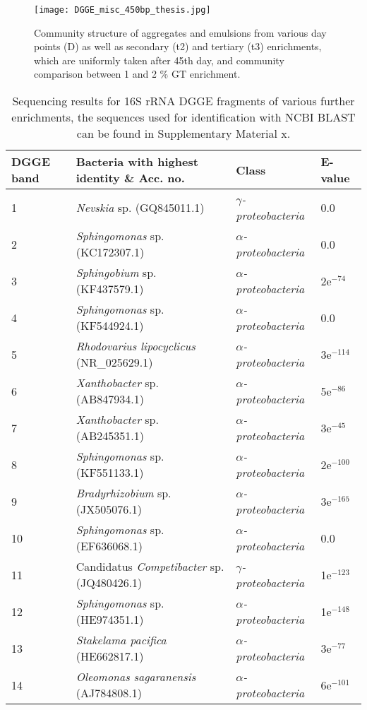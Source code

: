 \documentclass[11pt]{article}
\begin{document}
\begin{figure}
\texttt{[image: DGGE\_misc\_450bp\_thesis.jpg]}
\caption{Community structure of aggregates and emulsions from various day points (D) as well as secondary (t2) and tertiary (t3) enrichments, which are uniformly taken after 45th day, and community comparison between 1 and 2 \% GT enrichment.}
\end{figure}

\begin{table}
\caption{Sequencing results for 16S rRNA DGGE fragments of various further enrichments, the sequences used for identification with NCBI BLAST can be found in Supplementary Material x.}
\begin{tabular}{ | l | p{7.8cm} | p{3cm} | l | }
\hline
DGGE band & Bacteria with highest identity \& Acc. no. & Class & E-value \\
\hline
1 & \emph{Nevskia} sp. (GQ845011.1) & \emph{$\gamma$-proteobacteria} & 0.0  \\
\hline
2 & \emph{Sphingomonas} sp. (KC172307.1) & \emph{$\alpha$-proteobacteria} & 0.0 \\
\hline
3 & \emph{Sphingobium} sp. (KF437579.1) & \emph{$\alpha$-proteobacteria} & 2e$^{-74}$ \\
\hline
4 & \emph{Sphingomonas} sp. (KF544924.1) & \emph{$\alpha$-proteobacteria} & 0.0  \\
\hline
5 & \emph{Rhodovarius lipocyclicus} (NR\_025629.1) & \emph{$\alpha$-proteobacteria} & 3e$^{-114}$ \\
\hline
6 & \emph{Xanthobacter} sp. (AB847934.1) & \emph{$\alpha$-proteobacteria} & 5e$^{-86}$  \\
\hline
7 & \emph{Xanthobacter} sp. (AB245351.1) & \emph{$\alpha$-proteobacteria} & 3e$^{-45}$  \\
\hline
8 & \emph{Sphingomonas} sp.(KF551133.1) & \emph{$\alpha$-proteobacteria} & 2e$^{-100}$  \\
\hline
9 & \emph{Bradyrhizobium} sp. (JX505076.1) & \emph{$\alpha$-proteobacteria} & 3e$^{-165}$  \\
\hline
10 & \emph{Sphingomonas} sp. (EF636068.1) & \emph{$\alpha$-proteobacteria} & 0.0  \\
\hline
11 & Candidatus \emph{Competibacter} sp. (JQ480426.1) & \emph{$\gamma$-proteobacteria} & 1e$^{-123}$  \\
\hline
12 & \emph{Sphingomonas} sp. (HE974351.1) & \emph{$\alpha$-proteobacteria} &  1e$^{-148}$ \\
\hline
13 & \emph{Stakelama pacifica} (HE662817.1) & \emph{$\alpha$-proteobacteria} & 3e$^{-77}$  \\
\hline
14 & \emph{Oleomonas sagaranensis} (AJ784808.1) & \emph{$\alpha$-proteobacteria} & 6e$^{-101}$  \\
\hline
\end{tabular}

\end{table}
\FloatBarrier
\end{document}
